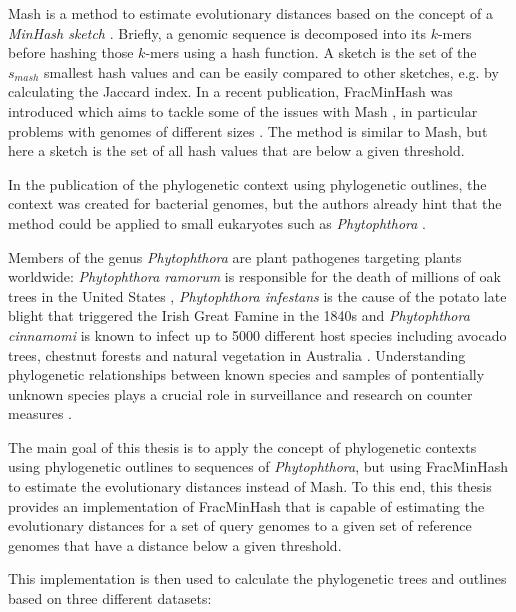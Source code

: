 Mash is a method to estimate evolutionary distances based on the concept of a
\textit{MinHash sketch}
\cite{broderResemblanceContainmentDocuments1998a,ondovMashFastGenome2016}.
Briefly, a genomic sequence is decomposed into its $k$-mers before hashing those
$k$-mers using a hash function. A sketch is the set of the $s_{mash}$ smallest
hash values and can be easily compared to other sketches, e.g. by calculating
the Jaccard index. In a recent publication, FracMinHash was introduced
which aims to tackle some of the issues with Mash
\cite{irberLightweightCompositionalAnalysis2022}, in particular problems with
genomes of different sizes
\cite{heraDerivingConfidenceIntervals2023,irberLightweightCompositionalAnalysis2022}.
The method is similar to Mash, but here a sketch is the set of all hash values
that are below a given threshold.

In the publication of the phylogenetic context using phylogenetic outlines, the
context was created for bacterial genomes, but the authors already
hint that the method could be applied to small eukaryotes such as
\textit{Phytophthora} \cite{bagciMicrobialPhylogeneticContext2021}.

Members of the genus \textit{Phytophthora} are plant pathogenes targeting plants
worldwide: \textit{Phytophthora ramorum} is responsible for the death of
millions of oak trees in the United States
\cite{cobbMagnitudeRegionalScaleTree2020}, \textit{Phytophthora infestans} is
the cause of the potato late blight that triggered the Irish Great Famine in the
1840s \cite{yoshidaRiseFallPhytophthora2013} and \textit{Phytophthora cinnamomi}
is known to infect up to 5000 different host species including avocado trees,
chestnut forests and natural vegetation in Australia
\cite{hardhamPhytophthoraCinnamomi2018}. Understanding phylogenetic
relationships between known species and samples of pontentially unknown species
plays a crucial role in surveillance and research on counter measures
\cite{piomboMetagenomicsApproachesDetection2021}.


The main goal of this thesis is to apply the concept of phylogenetic contexts
using phylogenetic outlines to sequences of \textit{Phytophthora}, but using
FracMinHash to estimate the evolutionary distances instead of Mash. To this end,
this thesis provides an implementation of FracMinHash that is capable of
estimating the evolutionary distances for a set of query genomes to a given set
of reference genomes that have a distance below a given threshold.

This implementation is then used to calculate the phylogenetic trees and
outlines based on three different datasets:

